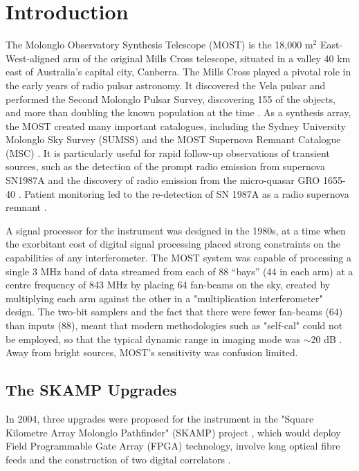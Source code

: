 \section{Introduction} 
The Molonglo Observatory Synthesis Telescope (MOST) is the 18,000 m$^2$ East-West-aligned arm of the original Mills Cross telescope, situated in a valley 40 km east of Australia's capital city, Canberra. The Mills Cross played a pivotal role in the early years of radio pulsar astronomy. It discovered the Vela pulsar \citep{Large_1968} and performed the Second Molonglo Pulsar Survey, discovering 155 of the objects, and more than doubling the known population at the time \citep{Manchester_1978}. As a synthesis array, the MOST created many important catalogues, including the Sydney University Molonglo Sky Survey (SUMSS) \citep{Bock_1999,Mauch_2003} and the MOST Supernova Remnant Catalogue (MSC) \citep{Whiteoak_1996}. It is particularly useful for rapid follow-up observations of transient sources, such as the detection of the prompt radio emission from supernova SN1987A \citep{Turtle_1987} and the discovery of radio emission from the micro-quasar GRO 1655-40 \citep{Tingay_1995}. Patient monitoring led to the re-detection of SN 1987A as a radio supernova remnant \citep{Staveley_Smith_1992}.

A signal processor \citep{Robertson_1991} for the instrument was designed in the 1980s, at a time when the exorbitant cost of digital signal processing placed strong constraints on the capabilities of any interferometer. The MOST system was capable of processing a single 3 MHz band of data streamed from each of 88 ``bays'' (44 in each arm) at a centre frequency of 843 MHz by placing 64 fan-beams on the sky, created by multiplying each arm against the other in a "multiplication interferometer" design. The two-bit samplers and the fact that there were fewer fan-beams (64) than inputs (88), meant that modern methodologies such as "self-cal" could not be employed, so that the typical dynamic range in imaging mode was $\sim$20 dB \citep{Robertson_1991}. Away from bright sources, MOST's sensitivity was confusion limited.

\subsection{The SKAMP Upgrades}
In 2004, three upgrades were proposed for the instrument in the "Square Kilometre Array Molonglo Pathfinder" (SKAMP) project \cite{Adams_2004}, which would deploy Field Programmable Gate Array (FPGA) technology, involve long optical fibre feeds and the construction of two digital correlators \citep{Adams_2004}. 

